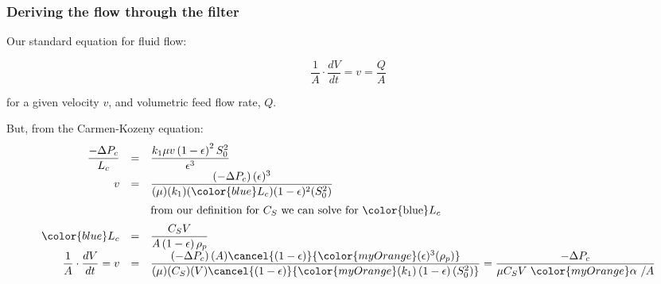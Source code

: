 \begin{frame}\frametitle{Deriving the flow through the filter}
	Our standard equation for fluid flow:
	\begin{exampleblock}{}
		\[\dfrac{1}{A} \cdot \dfrac{dV}{dt} = v = \dfrac{Q}{A}\]
	\end{exampleblock}
	for a given velocity $v$, and volumetric feed flow rate, $Q$.

	\vspace{12pt}
	But, from the Carmen-Kozeny equation:
	\[
		\begin{array}{rcl}
			\dfrac{-\Delta P_c}{L_c} &=& \dfrac{k_1  \mu  v \left(1-\epsilon\right)^2 S_0^2}{\epsilon^3}\\
			\vspace{6pt}
			v &=& \dfrac{\left(-\Delta P_c\right) (\epsilon)^3}{(\mu) (k_1) ({\color{blue}L_c})  (1-\epsilon)^2 (S_0^2)}\\

			\vspace{6pt}
			&&\text{from our definition for $C_S$ we can solve for {\color{blue}$L_c$}} \\
			{\color{blue}L_c} &=&  \dfrac{C_S V}{A \left(1-\epsilon\right)\rho_p}\\
			\vspace{6pt}
			\dfrac{1}{A} \cdot \dfrac{dV}{dt} = v &=& \dfrac{\left(-\Delta P_c\right) (A) \cancel{\left(1-\epsilon\right)} {\color{myOrange}(\epsilon)^3 (\rho_p)}}{(\mu) (C_S) (V) \cancel{\left(1-\epsilon\right)} {\color{myOrange}(k_1) \left(1-\epsilon\right) (S_0^2)}}
			= \dfrac{-\Delta P_c}{\mu C_S V \,\, {\color{myOrange}\mathbf{ \alpha}}\,\,/ A}
		\end{array}
	\]
\end{frame}

